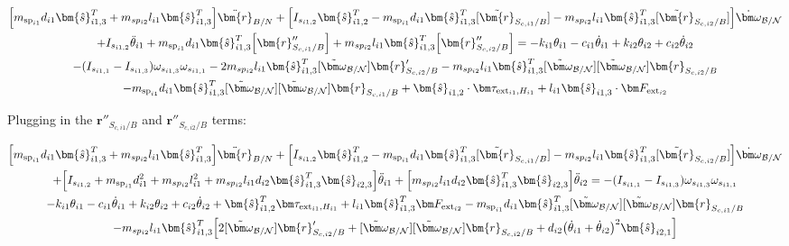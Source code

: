 \documentclass[paper]{aiaaNew}
\begin{document}
\begin{multline}
\Big[m_{\text{sp}_{i1}} d_{i1} \bm{\hat{s}}_{i1,3}^T + m_{sp_{i2}} l_{i1} \bm{\hat{s}}_{i1,3}^T \Big] \ddot{\bm{r}}_{B/N} + \Big[I_{s_{i1,2}} \bm{\hat{s}}_{i1,2}^T - m_{\text{sp}_{i1}} d_{i1} \bm{\hat{s}}_{i1,3}^T [\tilde{\bm{r}}_{S_{c,i1}/B}] - m_{sp_{i2}} l_{i1} \bm{\hat{s}}_{i1,3}^T [\tilde{\bm{r}}_{S_{c,i2}/B}] \Big] \dot{\bm \omega}_{\cal{B/N}} \\
+ I_{s_{i1,2}} \ddot{\theta}_{i1} + m_{\text{sp}_{i1}} d_{i1} \bm{\hat{s}}_{i1,3}^T \Big[ \bm{r}''_{S_{c,i1}/B} 
\Big] + m_{sp_{i2}} l_{i1} \bm{\hat{s}}_{i1,3}^T \Big[ \bm{r}''_{S_{c,i2}/B}\Big]
= -k_{i1} \theta_{i1} - c_{i1} \dot{\theta}_{i1} + k_{i2} \theta_{i2} + c_{i2} \dot{\theta}_{i2} \\
- (I_{s_{i1,1}} - I_{s_{i1,3}}) \omega_{s_{i1,3}} \omega_{s_{i1,1}} 
- 2 m_{sp_{i2}} l_{i1} \bm{\hat{s}}_{i1,3}^T [\tilde{\bm\omega}_{\cal B/N}] \bm{r}'_{S_{c,i2}/B}
- m_{sp_{i2}} l_{i1} \bm{\hat{s}}_{i1,3}^T [\tilde{\bm\omega}_{\cal B/N}] [\tilde{\bm\omega}_{\cal B/N}] \bm{r}_{S_{c,i2}/B}\\ 
- m_{\text{sp}_{i1}} d_{i1} \bm{\hat{s}}_{i1,3}^T [\tilde{\bm\omega}_{\cal B/N}] [\tilde{\bm\omega}_{\cal B/N}] \bm{r}_{S_{c,i1}/B}
+ \bm{\hat{s}}_{i1,2} \cdot \bm \tau_{\text{ext}_{i1},H_{i1}}
+ l_{i1} \bm{\hat{s}}_{i1,3} \cdot \bm F_{\text{ext}_{i2}} 
\end{multline}

Plugging in the $\bm{r}''_{S_{c,i1}/B}$ and $\bm{r}''_{S_{c,i2}/B}$ terms:

\begin{multline}
\Big[m_{\text{sp}_{i1}} d_{i1} \bm{\hat{s}}_{i1,3}^T + m_{sp_{i2}} l_{i1} \bm{\hat{s}}_{i1,3}^T \Big] \ddot{\bm{r}}_{B/N} + \Big[I_{s_{i1,2}} \bm{\hat{s}}_{i1,2}^T - m_{\text{sp}_{i1}} d_{i1} \bm{\hat{s}}_{i1,3}^T [\tilde{\bm{r}}_{S_{c,i1}/B}] - m_{sp_{i2}} l_{i1} \bm{\hat{s}}_{i1,3}^T [\tilde{\bm{r}}_{S_{c,i2}/B}] \Big] \dot{\bm \omega}_{\cal{B/N}} \\
+ \Big[I_{s_{i1,2}} + m_{\text{sp}_{i1}} d_{i1}^2 + m_{sp_{i2}} l_{i1}^2 + m_{sp_{i2}} l_{i1} d_{i2} \bm{\hat{s}}_{i1,3}^T \bm{\hat{s}}_{i2,3} \Big] \ddot{\theta}_{i1} + \Big[m_{sp_{i2}} l_{i1} d_{i2} \bm{\hat{s}}_{i1,3}^T \bm{\hat{s}}_{i2,3} \Big]\ddot{\theta}_{i2}
= - (I_{s_{i1,1}} - I_{s_{i1,3}}) \omega_{s_{i1,3}} \omega_{s_{i1,1}}\\ -k_{i1} \theta_{i1} - c_{i1} \dot{\theta}_{i1} 
+ k_{i2} \theta_{i2} + c_{i2} \dot{\theta}_{i2} + \bm{\hat{s}}_{i1,2}^T \bm \tau_{\text{ext}_{i1},H_{i1}}
+ l_{i1} \bm{\hat{s}}_{i1,3}^T \bm F_{\text{ext}_{i2}} 
- m_{\text{sp}_{i1}} d_{i1} \bm{\hat{s}}_{i1,3}^T [\tilde{\bm\omega}_{\cal B/N}] [\tilde{\bm\omega}_{\cal B/N}] \bm{r}_{S_{c,i1}/B}\\
 - m_{sp_{i2}} l_{i1} \bm{\hat{s}}_{i1,3}^T\Big[ 2 [\tilde{\bm\omega}_{\cal B/N}] \bm{r}'_{S_{c,i2}/B} + [\tilde{\bm\omega}_{\cal B/N}] [\tilde{\bm\omega}_{\cal B/N}] \bm{r}_{S_{c,i2}/B} + d_{i2} \big(\dot{\theta}_{i1} + \dot{\theta}_{i2}\big)^2 \bm{\hat{s}}_{i2,1}\Big]
\end{multline}
\end{document}
